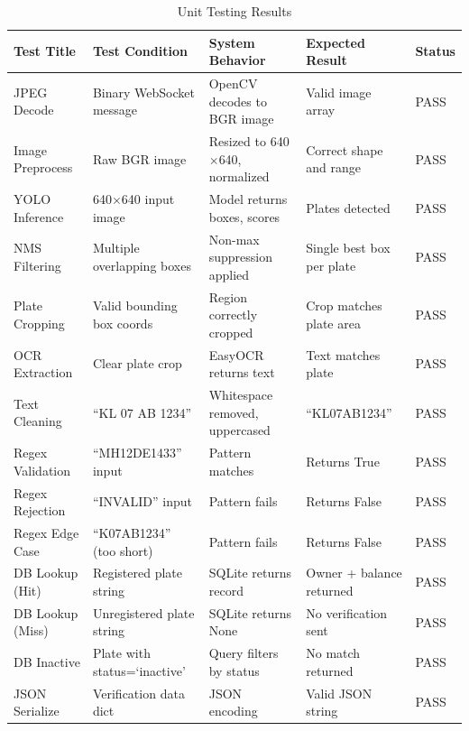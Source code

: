 \begin{table}[H]
\centering
\renewcommand{\arraystretch}{1.4}
\setlength{\tabcolsep}{3pt}
\footnotesize
\begin{tabular}{| m{2.3cm} | m{3.2cm} | m{3.5cm} | m{3.2cm} | m{1.2cm} |}
\hline
\textbf{Test Title} & \textbf{Test Condition} & \textbf{System Behavior} & \textbf{Expected Result} & \textbf{Status} \\
\hline
JPEG Decode & Binary WebSocket message & OpenCV decodes to BGR image & Valid image array & PASS \\
\hline
Image Preprocess & Raw BGR image & Resized to 640$\times$640, normalized & Correct shape and range & PASS \\
\hline
YOLO Inference & 640$\times$640 input image & Model returns boxes, scores & Plates detected & PASS \\
\hline
NMS Filtering & Multiple overlapping boxes & Non-max suppression applied & Single best box per plate & PASS \\
\hline
Plate Cropping & Valid bounding box coords & Region correctly cropped & Crop matches plate area & PASS \\
\hline
OCR Extraction & Clear plate crop & EasyOCR returns text & Text matches plate & PASS \\
\hline
Text Cleaning & ``KL 07 AB 1234'' & Whitespace removed, uppercased & ``KL07AB1234'' & PASS \\
\hline
Regex Validation & ``MH12DE1433'' input & Pattern matches & Returns True & PASS \\
\hline
Regex Rejection & ``INVALID'' input & Pattern fails & Returns False & PASS \\
\hline
Regex Edge Case & ``K07AB1234'' (too short) & Pattern fails & Returns False & PASS \\
\hline
DB Lookup (Hit) & Registered plate string & SQLite returns record & Owner + balance returned & PASS \\
\hline
DB Lookup (Miss) & Unregistered plate string & SQLite returns None & No verification sent & PASS \\
\hline
DB Inactive & Plate with status=`inactive' & Query filters by status & No match returned & PASS \\
\hline
JSON Serialize & Verification data dict & JSON encoding & Valid JSON string & PASS \\
\hline
\end{tabular}
\caption{Unit Testing Results}
\end{table}

